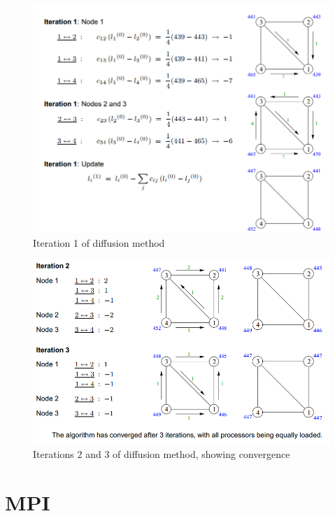 \documentclass{article}
\begin{document}
\begin{figure}[H]
	\centering
	\includegraphics[scale=0.5]{figures/diffusion-method-example2.png}
	\caption{Iteration 1 of diffusion method}
	\label{fig:diffussion-method-example2}
\end{figure}

\begin{figure}[H]
	\centering
	\includegraphics[scale=0.5]{figures/diffusion-method-example3.png}
	\caption{Iterations 2 and 3 of diffusion method, showing convergence}
	\label{fig:diffussion-method-example3}
\end{figure}

\section{MPI}
\end{document}
